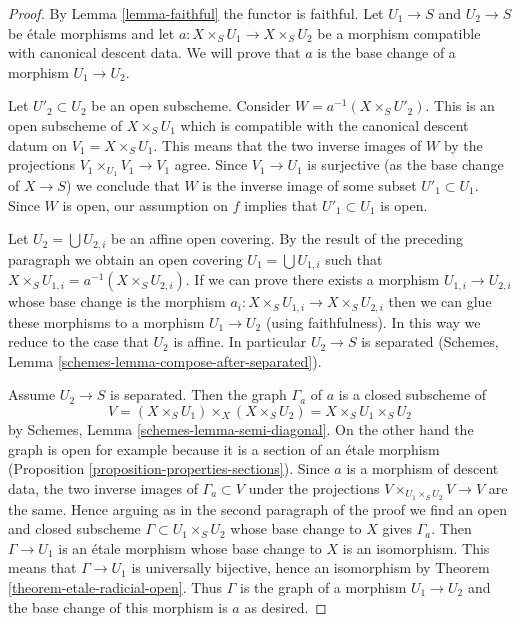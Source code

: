 \documentclass{stacks-project}
\theoremstyle{plain}
\theoremstyle{definition}
\theoremstyle{remark}
\numberwithin{equation}{subsection}
\begin{document}
\begin{proof}
By Lemma \ref{lemma-faithful} the functor is faithful.
Let $U_1 \to S$ and $U_2 \to S$ be \'etale morphisms
and let $a : X \times_S U_1 \to X \times_S U_2$ be a
morphism compatible with canonical descent data.
We will prove that $a$ is the base change of a morphism $U_1 \to U_2$.

\medskip\noindent
Let $U'_2 \subset U_2$ be an open subscheme. Consider
$W = a^{-1}(X \times_S U'_2)$. This is an open subscheme
of $X \times_S U_1$ which is compatible with the canonical
descent datum on $V_1 = X \times_S U_1$. This means that the
two inverse images of $W$ by the projections
$V_1 \times_{U_1} V_1 \to V_1$ agree. Since $V_1 \to U_1$
is surjective (as the base change of $X \to S$) we conclude
that $W$ is the inverse image of some subset $U'_1 \subset U_1$.
Since $W$ is open, our assumption on $f$ implies that $U'_1 \subset U_1$
is open.

\medskip\noindent
Let $U_2 = \bigcup U_{2, i}$ be an affine open covering.
By the result of the preceding paragraph we obtain an open
covering $U_1 = \bigcup U_{1, i}$ such that
$X \times_S U_{1, i} = a^{-1}(X \times_S U_{2, i})$.
If we can prove there exists a morphism $U_{1, i} \to U_{2, i}$
whose base change is the morphism
$a_i : X \times_S U_{1, i} \to X \times_S U_{2, i}$
then we can glue these morphisms to a morphism $U_1 \to U_2$
(using faithfulness). In this way we reduce to the case that
$U_2$ is affine. In particular $U_2 \to S$ is separated
(Schemes, Lemma \ref{schemes-lemma-compose-after-separated}).

\medskip\noindent
Assume $U_2 \to S$ is separated. Then the graph $\Gamma_a$ of $a$
is a closed subscheme of
$$
V = (X \times_S U_1) \times_X (X \times_S U_2) = X \times_S U_1 \times_S U_2
$$
by Schemes, Lemma \ref{schemes-lemma-semi-diagonal}.
On the other hand the graph is open for example
because it is a section of an \'etale morphism
(Proposition \ref{proposition-properties-sections}).
Since $a$ is a morphism of descent data, the two inverse images of
$\Gamma_a \subset V$ under the projections
$V \times_{U_1 \times_S U_2} V \to V$ are the same.
Hence arguing as in the second paragraph of the proof we
find an open and closed subscheme $\Gamma \subset U_1 \times_S U_2$
whose base change to $X$ gives $\Gamma_a$. Then
$\Gamma \to U_1$ is an \'etale morphism whose base change
to $X$ is an isomorphism. This means that $\Gamma \to U_1$
is universally bijective, hence an isomorphism
by Theorem \ref{theorem-etale-radicial-open}.
Thus $\Gamma$ is the graph of a morphism $U_1 \to U_2$
and the base change of this morphism is $a$ as desired.
\end{proof}
\end{document}
